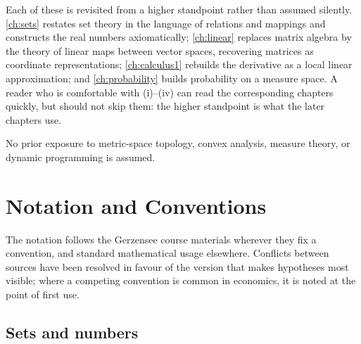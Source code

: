 Each of these is revisited from a higher standpoint rather than assumed silently.
\autoref{ch:sets} restates set theory in the language of relations and mappings
and constructs the real numbers axiomatically; \autoref{ch:linear} replaces
matrix algebra by the theory of linear maps between vector spaces, recovering
matrices as coordinate representations; \autoref{ch:calculus1} rebuilds the
derivative as a local linear approximation; and \autoref{ch:probability} builds
probability on a measure space. A reader who is comfortable with (i)--(iv) can
read the corresponding chapters quickly, but should not skip them: the higher
standpoint is what the later chapters use.

No prior exposure to metric-space topology, convex analysis, measure theory, or
dynamic programming is assumed.

\chapter*{Notation and Conventions}

The notation follows the Gerzensee course materials wherever they fix a
convention, and standard mathematical usage elsewhere. Conflicts between sources
have been resolved in favour of the version that makes hypotheses most visible;
where a competing convention is common in economics, it is noted at the point of
first use.

\section*{Sets and numbers}

